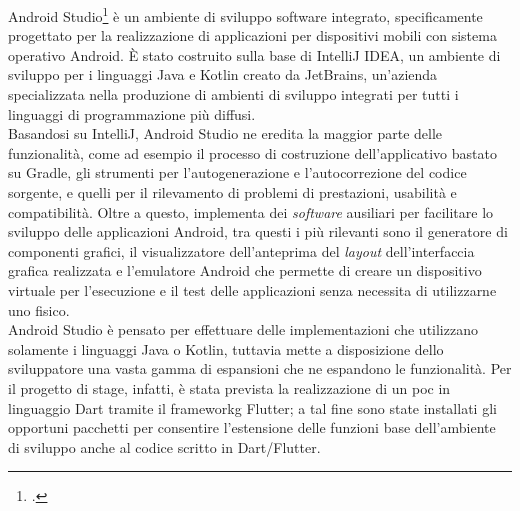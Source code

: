 Android Studio\footcite{site:android-studio} è un ambiente di sviluppo software integrato, specificamente progettato per la realizzazione di applicazioni per dispositivi mobili con sistema operativo Android. È stato costruito sulla base di IntelliJ IDEA, un ambiente di sviluppo per i linguaggi Java e Kotlin creato da JetBrains, un'azienda specializzata nella produzione di ambienti di sviluppo integrati per tutti i linguaggi di programmazione più diffusi.\\
Basandosi su IntelliJ, Android Studio ne eredita la maggior parte delle funzionalità, come ad esempio il processo di costruzione dell'applicativo bastato su Gradle, gli strumenti per l'autogenerazione e l'autocorrezione del codice sorgente, e quelli per il rilevamento di problemi di prestazioni, usabilità e compatibilità. Oltre a questo, implementa dei \textit{software} ausiliari per facilitare lo sviluppo delle applicazioni Android, tra questi i più rilevanti sono il generatore di componenti grafici, il visualizzatore dell'anteprima del \textit{layout} dell'interfaccia grafica realizzata e l'emulatore Android che permette di creare un dispositivo virtuale per l'esecuzione e il test delle applicazioni senza necessita di utilizzarne uno fisico.\\
Android Studio è pensato per effettuare delle implementazioni che utilizzano solamente i linguaggi Java o Kotlin, tuttavia mette a disposizione dello sviluppatore una vasta gamma di espansioni che ne espandono le funzionalità. Per il progetto di stage, infatti, è stata prevista la realizzazione di un \gls{poc} in linguaggio Dart tramite il \gls{frameworkg} Flutter; a tal fine sono state installati gli opportuni pacchetti per consentire l'estensione delle funzioni base dell'ambiente di sviluppo anche al codice scritto in Dart/Flutter.
